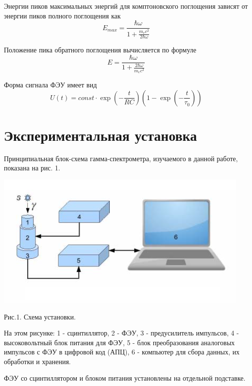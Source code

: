 \documentclass[14pt,a4paper]{scrartcl}
\begin{document}
		Энергии пиков максимальных энергий для комптоновского поглощения зависят от энергии пиков полного поглощения как
	\begin{equation}
		E_{max} = \frac{\hbar \omega}{1 + \frac{m_e c^2}{2 \hbar \omega}}
	\end{equation}
	
	Положение пика обратного поглощения вычисляется по формуле
	\begin{equation}
		E = \frac{\hbar \omega}{1 + \frac{2 \hbar \omega}{m_e c^2}}
	\end{equation}
	
	Форма сигнала ФЭУ имеет вид
	\begin{equation}
		U(t) = const \cdot \exp\left(-\frac{t}{RC}\right)\left(1 - \exp\left(-\frac{t}{\tau_0}\right)\right)
	\end{equation}




\section{Экспериментальная установка}


Принципиальная блок-схема гамма-спектрометра, изучаемого в данной работе, показана на рис. 1.


\begin{center}
\includegraphics[scale=0.5]{laba.png}\newline
\caption{Рис.1. Схема установки.}
\end{center}

На этом рисунке: 1 - сцинтиллятор, 2 - ФЭУ, 3 - предусилитель импульсов, 4 - высоковольтный блок питания для ФЭУ, 5 - блок преобразования аналоговых импульсов с ФЭУ в цифровой код (АПЦ), 6 - компьютер для сбора данных, их обработки и хранения. 

ФЭУ со сцинтиллятором и блоком питания установлены на отдельной подставке. 
\end{document}

